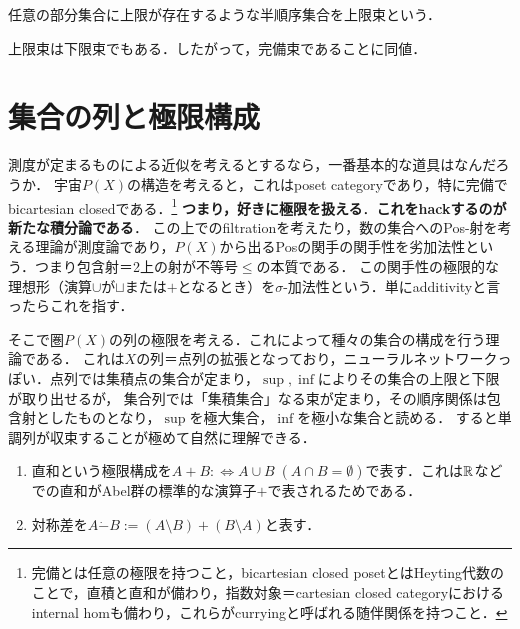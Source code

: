 \documentclass[uplatex, dvipdfmx]{jsreport}
\begin{document}
\begin{definition}[suplattice]
    任意の部分集合に上限が存在するような半順序集合を上限束という．
\end{definition}

\begin{lemma}
    上限束は下限束でもある．したがって，完備束であることに同値．
\end{lemma}

\section{集合の列と極限構成}

\begin{tcolorbox}[colframe=ForestGreen, colback=ForestGreen!10!white,breakable,colbacktitle=ForestGreen!40!white,coltitle=black,fonttitle=\bfseries\sffamily,
    title=積分論とは，集合の列による極限構成を基本言語とする理論である]
    測度が定まるものによる近似を考えるとするなら，一番基本的な道具はなんだろうか．
    宇宙$P(X)$の構造を考えると，これはposet categoryであり，特に完備でbicartesian closedである．\footnote{完備とは任意の極限を持つこと，bicartesian closed posetとはHeyting代数のことで，直積と直和が備わり，指数対象＝cartesian closed categoryにおけるinternal homも備わり，これらがcurryingと呼ばれる随伴関係を持つこと．}
    \textbf{つまり，好きに極限を扱える}．\textbf{これをhackするのが新たな積分論である}．
    この上でのfiltrationを考えたり，数の集合へのPos-射を考える理論が測度論であり，$P(X)$から出るPosの関手の関手性を劣加法性という．つまり包含射＝2上の射が不等号$\le$の本質である．
    この関手性の極限的な理想形（演算$\cup$が$\sqcup$または$+$となるとき）を$\sigma$-加法性という．単にadditivityと言ったらこれを指す．

    そこで圏$P(X)$の列の極限を考える．これによって種々の集合の構成を行う理論である．
    これは$X$の列＝点列の拡張となっており，ニューラルネットワークっぽい．点列では集積点の集合が定まり，$\sup,\inf$によりその集合の上限と下限が取り出せるが，
    集合列では「集積集合」なる束が定まり，その順序関係は包含射としたものとなり，$\sup$を極大集合，$\inf$を極小な集合と読める．
    すると単調列が収束することが極めて自然に理解できる．
\end{tcolorbox}

\begin{notation}\mbox{}
    \begin{enumerate}
        \item 直和という極限構成を$A+B:\Leftrightarrow A\cup B\;(A\cap B=\emptyset)$で表す．これは$\mathbb{R}$などでの直和がAbel群の標準的な演算子$+$で表されるためである．
        \item 対称差を$A\dot{-}B:=(A\setminus B)+(B\setminus A)$と表す．
    \end{enumerate}
\end{notation}
\end{document}
